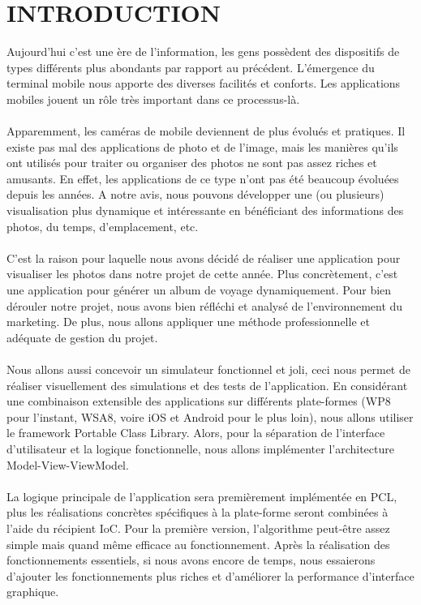 \documentclass{article}
\begin{document}
\vspace{2cm}
\section{\LARGE INTRODUCTION}


Aujourd’hui c’est une ère de l’information, les gens possèdent des dispositifs de types différents plus abondants par rapport au précédent. L’émergence du terminal mobile nous apporte des diverses facilités et conforts. Les applications mobiles jouent un rôle très important dans ce processus-là. 
\\\\
Apparemment, les caméras de mobile deviennent de plus évolués et pratiques. Il existe pas mal des applications de photo et de l’image, mais les manières qu’ils ont utilisés pour traiter ou organiser des photos ne sont pas assez riches et amusants. En effet, les applications de ce type n’ont pas été beaucoup évoluées depuis les années. A notre avis, nous pouvons développer une (ou plusieurs) visualisation plus dynamique et intéressante en bénéficiant des informations des photos, du temps, d’emplacement, etc.
\\\\
C’est la raison pour laquelle nous avons décidé de réaliser une application pour visualiser les photos dans notre projet de cette année. Plus concrètement, c’est une application pour générer un album de voyage dynamiquement.  Pour bien dérouler notre projet, nous avons bien réfléchi et analysé de l’environnement du marketing. De plus, nous allons appliquer une méthode professionnelle et adéquate de gestion du projet.
\\\\
Nous allons aussi concevoir un simulateur fonctionnel et joli, ceci nous permet de réaliser visuellement des simulations et des tests de l’application. En considérant une combinaison extensible des applications sur différents plate-formes (WP8 pour l’instant, WSA8, voire iOS et Android pour le plus loin), nous allons utiliser le framework Portable Class Library. Alors, pour la séparation de l'interface d'utilisateur et la logique fonctionnelle, nous allons implémenter l'architecture Model-View-ViewModel. 
\\\\
La logique principale de l’application sera premièrement implémentée en PCL, plus les réalisations concrètes spécifiques à la plate-forme seront combinées à l’aide du récipient IoC. Pour la première version, l’algorithme peut-être assez simple mais quand même efficace au fonctionnement. Après la réalisation des fonctionnements essentiels, si nous avons encore de temps, nous essaierons d’ajouter les fonctionnements plus riches et d’améliorer la performance d’interface graphique.
\end{document}
